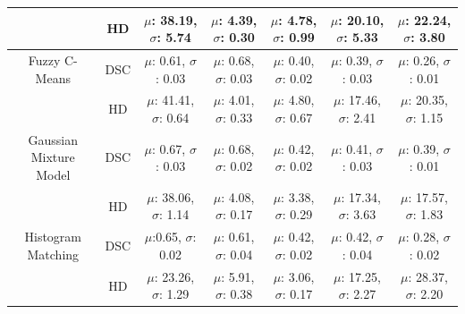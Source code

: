 \documentclass[article]{IEEEtran}
\begin{document}
\begin{table}[ht]
\begin{center}
\begin{threeparttable}
\begin{tabular}{c c c c c c c}
								&	HD		&	$\mu$: 38.19, $\sigma$: 5.74		&	$\mu$: 4.39, $\sigma$: 0.30		&	$\mu$: 4.78, $\sigma$: 0.99		&	$\mu$: 20.10, $\sigma$: 5.33		&	$\mu$: 22.24, $\sigma$: 3.80 	\\ \midrule
		Fuzzy C-Means 			&	DSC		&	$\mu$: 0.61, $\sigma$: 0.03		&	$\mu$: 0.68, $\sigma$: 0.03		&	$\mu$: 0.40, $\sigma$: 0.02		&	$\mu$: 0.39, $\sigma$: 0.03		&	$\mu$: 0.26, $\sigma$: 0.01 	\\ \cmidrule(lr{1em}){2-7}
								&	HD		&	$\mu$: 41.41, $\sigma$: 0.64		&	$\mu$: 4.01, $\sigma$: 0.33		&	$\mu$: 4.80, $\sigma$: 0.67		&	$\mu$: 17.46, $\sigma$: 2.41		&	$\mu$: 20.35, $\sigma$: 1.15 	\\ \midrule
		Gaussian Mixture Model	&	DSC		&	$\mu$: 0.67, $\sigma$: 0.03		&	$\mu$: 0.68, $\sigma$: 0.02 		& 	$\mu$: 0.42, $\sigma$: 0.02		& 	$\mu$: 0.41, $\sigma$: 0.03 		& 	$\mu$: 0.39, $\sigma$: 0.01 	\\ \cmidrule(lr{1em}){2-7}
								&	HD		& 	$\mu$: 38.06, $\sigma$: 1.14 		& 	$\mu$: 4.08, $\sigma$: 0.17 		& 	$\mu$: 3.38, $\sigma$: 0.29 		& 	$\mu$: 17.34, $\sigma$: 3.63 		& 	$\mu$: 17.57, $\sigma$: 1.83 	\\ \midrule
		Histogram Matching	 	&	DSC		& 	$\mu$:0.65, $\sigma$: 0.02 		& 	$\mu$: 0.61, $\sigma$: 0.04 		& 	$\mu$: 0.42, $\sigma$: 0.02 		& 	$\mu$: 0.42, $\sigma$: 0.04		& 	$\mu$: 0.28, $\sigma$: 0.02 	\\ \cmidrule(lr{1em}){2-7}
								&	HD		& 	$\mu$: 23.26, $\sigma$: 1.29		&  	$\mu$: 5.91, $\sigma$: 0.38 		& 	$\mu$: 3.06, $\sigma$: 0.17 		& 	$\mu$: 17.25, $\sigma$: 2.27		& 	$\mu$: 28.37, $\sigma$: 2.20 	\\  \bottomrule
	\end{tabular}
	\end{threeparttable}
	\end{center}
\end{table}
\end{document}
